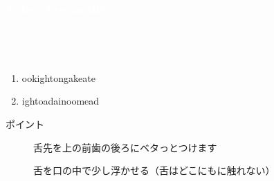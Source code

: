 \documentclass[aspectratio=169,xcolor={dvipsnames,table}]{beamer}
\begin{document}
\begin{frame}
\centering
  \textcolor{white}{\Huge\bfseries Today's Pronunciation}\pause

 \vspace{30pt}

  \textcolor{white}{\Huge\bfseries {}, }


\end{frame}
\begin{frame}[plain]{\,\,\,}

\large

\begin{enumerate}
 \item  {}\hspace{20pt}ook\hspace{1\zw}ight\hspace{1\zw}ong\hspace{1\zw}ake\hspace{1\zw}ate
 \item  {}\hspace{20pt}ight\hspace{1\zw}oad\hspace{1\zw}ain\hspace{1\zw}oom\hspace{1\zw}ead
\end{enumerate}

\vspace*{20pt}

\normalsize
ポイント

\begin{description}
 \item[] 舌先を上の前歯の後ろにベタっとつけます
 \item[] 舌を口の中で少し浮かせる（舌はどこにもに触れない）
\end{description}
\hfill{}
\end{frame}
\end{document}
